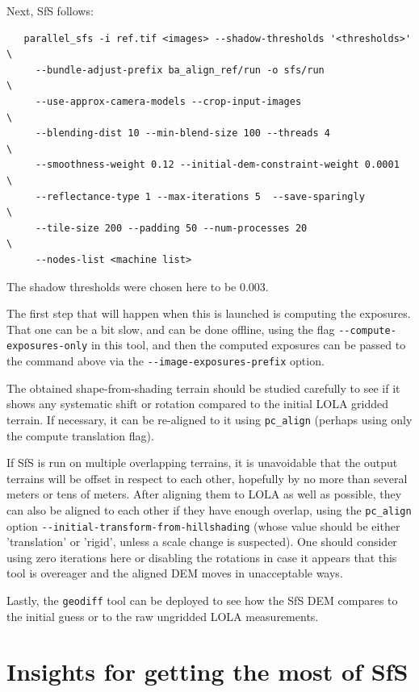 Next, SfS follows:

\begin{verbatim}
   parallel_sfs -i ref.tif <images> --shadow-thresholds '<thresholds>'  \
     --bundle-adjust-prefix ba_align_ref/run -o sfs/run                 \ 
     --use-approx-camera-models --crop-input-images                     \
     --blending-dist 10 --min-blend-size 100 --threads 4                \
     --smoothness-weight 0.12 --initial-dem-constraint-weight 0.0001    \
     --reflectance-type 1 --max-iterations 5  --save-sparingly          \
     --tile-size 200 --padding 50 --num-processes 20                    \
     --nodes-list <machine list>
\end{verbatim}

The shadow thresholds were chosen here to be 0.003.

The first step that will happen when this is launched is computing the
exposures. That one can be a bit slow, and can be done offline, using
the flag \texttt{-\/-compute-exposures-only} in this tool, and then the
computed exposures can be passed to the command above via the
\texttt{-\/-image-exposures-prefix} option.

The obtained shape-from-shading terrain should be studied carefully to
see if it shows any systematic shift or rotation compared to the initial
LOLA gridded terrain. If necessary, it can be re-aligned to it using
\texttt{pc\_align} (perhaps using only the compute translation flag).

If SfS is run on multiple overlapping terrains, it is unavoidable that
the output terrains will be offset in respect to each other, hopefully
by no more than several meters or tens of meters. After aligning them to
LOLA as well as possible, they can also be aligned to each other if they
have enough overlap, using the \texttt{pc\_align} option
\texttt{-\/-initial-transform-from-hillshading} (whose value should be
either 'translation' or 'rigid', unless a scale change is suspected).
One should consider using zero iterations here or disabling the
rotations in case it appears that this tool is overeager and the aligned
DEM moves in unacceptable ways.

Lastly, the \texttt{geodiff} tool can be deployed to see how the SfS DEM
compares to the initial guess or to the raw ungridded LOLA measurements.

\section{Insights for getting the most of SfS}
\label{sfs:insights}

